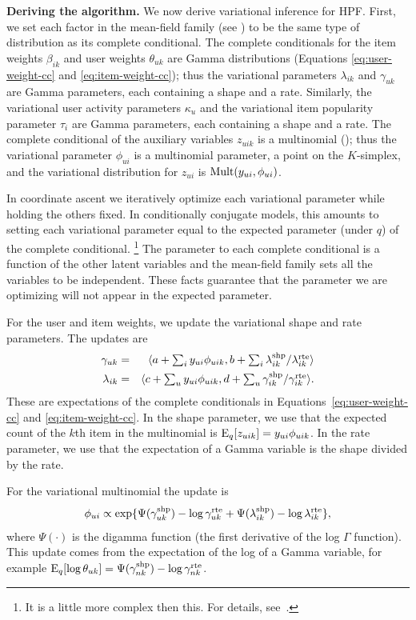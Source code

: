{\bf Deriving the algorithm.}
We now derive variational inference for HPF. First, we set each
factor in the mean-field family (see ) to be the same type of
distribution as its complete conditional.  The complete conditionals
for the item weights $\beta_{ik}$ and user weights $\theta_{uk}$ are
Gamma distributions (Equations \ref{eq:user-weight-cc} and
\ref{eq:item-weight-cc}); thus the variational parameters
$\lambda_{ik}$ and $\gamma_{uk}$ are Gamma parameters, each containing
a shape and a rate.  Similarly, the variational user activity
parameters $\kappa_u$ and the variational item popularity parameter
$\tau_i$ are Gamma parameters, each containing a shape and a rate.
The complete conditional of the auxiliary variables $z_{uik}$ is a
multinomial (); thus the variational parameter
$\phi_{ui}$ is a multinomial parameter, a point on the $K$-simplex,
and the variational distribution for $z_{ui}$ is $\textrm{Mult}(y_{ui},
\phi_{ui})$.

In coordinate ascent we iteratively optimize each variational
parameter while holding the others fixed.  In conditionally conjugate
models, this amounts to setting each variational parameter equal to
the expected parameter (under $q$) of the complete conditional.
\footnote{It is a little more complex then this. For details, see~\cite{Hoffman:2013}.}  
The parameter to each complete conditional is a function of the other
latent variables and the mean-field family sets all the variables to
be independent.  These facts guarantee that the parameter we are
optimizing will not appear in the expected parameter.

For the user and item weights, we update the variational shape and
rate parameters. The updates are
\begin{eqnarray}
  \gamma_{uk} &=& \langle a + \textstyle \sum_{i} y_{ui} \phi_{uik},
  b + \textstyle \sum_i \lambda_{ik}^{\textrm{shp}} / \lambda_{ik}^{\textrm{rte}} \rangle \\
  \lambda_{ik} &=& \langle c + \textstyle \sum_{u} y_{ui} \phi_{uik},
  d + \textstyle \sum_u \gamma_{ik}^{\textrm{shp}} / \gamma_{ik}^{\textrm{rte}} \rangle.
\end{eqnarray}
These are expectations of the complete conditionals in
Equations~\ref{eq:user-weight-cc} and \ref{eq:item-weight-cc}.  In the
shape parameter, we use that the expected count of the $k$th item in
the multinomial is $\textrm{E}_q[z_{uik}] = y_{ui} \phi_{uik}$. In the rate
parameter, we use that the expectation of a Gamma variable is the
shape divided by the rate.

For the variational multinomial the update is
\begin{equation}
  \phi_{ui} \propto \exp\{\Psi(\gamma_{uk}^{\textrm{shp}}) - \log
  \gamma_{uk}^{\textrm{rte}} + \Psi(\lambda_{ik}^{\textrm{shp}}) - \log
  \lambda_{ik}^{\textrm{rte}}\},
\end{equation}
where $\Psi(\cdot)$ is the digamma function (the first derivative of
the log $\Gamma$ function).  This update comes from the expectation of
the log of a Gamma variable, for example $\textrm{E}_q[\log \theta_{uk}] =
\Psi(\gamma_{nk}^{\textrm{shp}}) - \log \gamma_{nk}^{\textrm{rte}}$.

